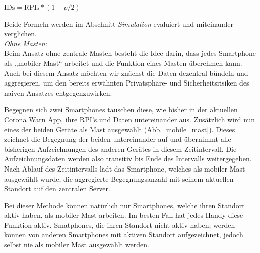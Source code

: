 \documentclass[conference]{IEEEtran}
\begin{document}
\centerline{$\text{IDs} = \text{RPIs} * (1-p/2)$}
Beide Formeln werden im Abschnitt \textit{Simulation} evaluiert und miteinander verglichen.\\

\textit{Ohne Masten:}\\
Beim Ansatz ohne zentrale Masten besteht die Idee darin, dass jedes Smartphone als „mobiler Mast“ arbeitet und die Funktion eines Masten überehmen kann.
Auch bei diesem Ansatz möchten wir znächst die Daten dezentral bündeln und aggregieren, um den bereits erwähnten Privatsphäre- und Sicherheitsrisiken des naiven Ansatzes entgegenzuwirken.  

Begegnen sich zwei Smartphones tauschen diese, wie bisher in der aktuellen Corona Warn App, ihre RPI's und Daten untereinander aus. 
Zusätzlich wird nun eines der beiden Geräte als Mast ausgewählt (Abb. \ref{mobile_mast}). 
Dieses zeichnet die Begegnung der beiden untereinander auf und übernimmt alle bisherigen Aufzeichnungen des anderen Gerätes in diesem Zeitintervall.
Die Aufzeichnungsdaten werden also transitiv bis Ende des Intervalls weitergegeben. 
Nach Ablauf des Zeitintervalls lädt das Smartphone, welches als mobiler Mast ausgewählt wurde, die aggregierte Begegnungsanzahl mit seinem aktuellen Standort auf den zentralen Server.

Bei dieser Methode können natürlich nur Smartphones, welche ihren Standort aktiv haben, als mobiler Mast arbeiten. 
Im besten Fall hat jedes Handy diese Funktion aktiv. Smatphones, die ihren Standort nicht aktiv haben, werden können von anderen Smartphones mit aktiven Standort aufgezeichnet, jedoch selbst nie als mobiler Mast ausgewählt werden.
\end{document}
